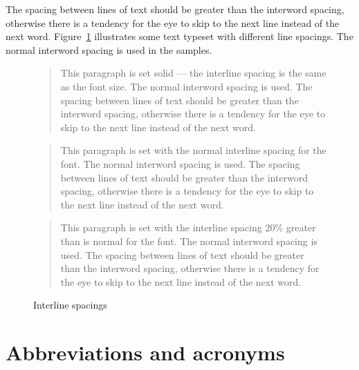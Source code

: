 \documentclass[10pt,letterpaper]{memoir}
\begin{document}
    The spacing between lines of text should be greater than the interword
spacing, otherwise there is a tendency for the eye to skip to the
next line instead of the next word. Figure~\ref{fig:interline} illustrates
some text typeset with different line spacings. The normal interword
spacing is used in the samples.

\begin{figure}
\centering
\begin{minipage}{\textwidth}
\mbox{}\hrulefill\mbox{}
\normalfont\setlength{\unitlength}{\baselineskip}
\begin{quotation}
\normalfont\setlength{\baselineskip}{1em}
    This paragraph is set solid --- the interline spacing is the same
as the font size. The normal interword spacing is used.
    The spacing between lines of text should be greater than the interword
spacing, otherwise there is a tendency for the eye to skip to the
next line instead of the next word. \par
\end{quotation}
\begin{quotation}
\normalfont\setlength{\baselineskip}{\unitlength}
    This paragraph is set with the normal interline spacing for the font.
The normal interword spacing is used.
    The spacing between lines of text should be greater than the interword
spacing, otherwise there is a tendency for the eye to skip to the
next line instead of the next word. \par
\end{quotation}
\begin{quotation}
\normalfont\setlength{\baselineskip}{1.2\unitlength}
    This paragraph is set with the interline spacing 20\% greater than
is normal for the font.
The normal interword spacing is used.
    The spacing between lines of text should be greater than the interword
spacing, otherwise there is a tendency for the eye to skip to the
next line instead of the next word. \par
\end{quotation}
\mbox{}\hrulefill\mbox{}
\end{minipage}
\normalfont\setlength{\baselineskip}{\unitlength}
\setlength{\unitlength}{1pt}
\caption{Interline spacings}\label{fig:interline}
\end{figure}

\section{Abbreviations and acronyms}
\end{document}
